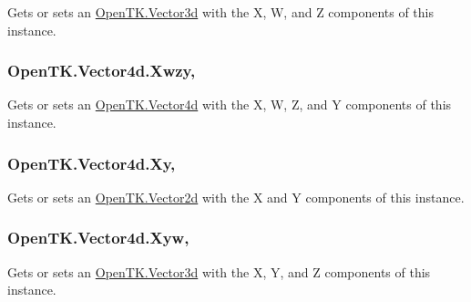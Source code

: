 Gets or sets an \hyperlink{struct_open_t_k_1_1_vector3d}{Open\-T\-K.\-Vector3d} with the X, W, and Z components of this instance. 

\hypertarget{struct_open_t_k_1_1_vector4d_a96c112078c860364f036800fe2209618}{
\subsubsection[{Xwzy}]{ Open\-T\-K.\-Vector4d.\-Xwzy\hspace{0.3cm}{\ttfamily [get]}, {\ttfamily [set]}}}\label{struct_open_t_k_1_1_vector4d_a96c112078c860364f036800fe2209618}


Gets or sets an \hyperlink{struct_open_t_k_1_1_vector4d}{Open\-T\-K.\-Vector4d} with the X, W, Z, and Y components of this instance. 

\hypertarget{struct_open_t_k_1_1_vector4d_abe07a639c5388fdeb6428426487ba426}{
\subsubsection[{Xy}]{ Open\-T\-K.\-Vector4d.\-Xy\hspace{0.3cm}{\ttfamily [get]}, {\ttfamily [set]}}}\label{struct_open_t_k_1_1_vector4d_abe07a639c5388fdeb6428426487ba426}


Gets or sets an \hyperlink{struct_open_t_k_1_1_vector2d}{Open\-T\-K.\-Vector2d} with the X and Y components of this instance. 

\hypertarget{struct_open_t_k_1_1_vector4d_aa5103a7c073c7305e801ee8510a753d4}{
\subsubsection[{Xyw}]{ Open\-T\-K.\-Vector4d.\-Xyw\hspace{0.3cm}{\ttfamily [get]}, {\ttfamily [set]}}}\label{struct_open_t_k_1_1_vector4d_aa5103a7c073c7305e801ee8510a753d4}


Gets or sets an \hyperlink{struct_open_t_k_1_1_vector3d}{Open\-T\-K.\-Vector3d} with the X, Y, and Z components of this instance. 

